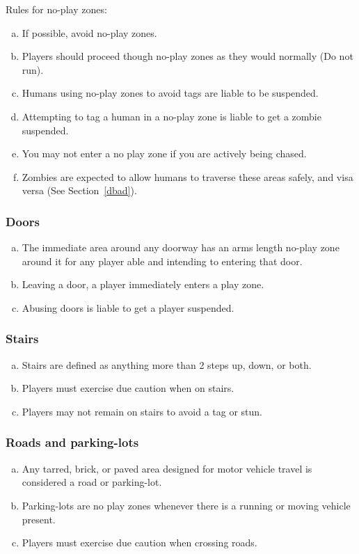 \documentclass[a4paper,12pt]{article}
\begin{document}
Rules for no-play zones:
\begin{enumerate}[(a)]
    \item If possible, avoid no-play zones.
    \item Players should proceed though no-play zones as they would normally (Do not run).
    \item Humans using no-play zones to avoid tags are liable to be suspended.     
    \item Attempting to tag a human in a no-play zone is liable to get a zombie suspended.
    \item You may not enter a no play zone if you are actively being chased.
    \item Zombies are expected to allow humans to traverse these areas safely, and visa versa (See Section~\ref{dbad}).
\end{enumerate}

\subsubsection{Doors}
\begin{enumerate}[(a)]
    \item The immediate area around any doorway has an arms length no-play zone around it for any player able and intending to entering that door. 
    \item Leaving a door, a player immediately enters a play zone.
    \item Abusing doors is liable to get a player suspended.
\end{enumerate}

\subsubsection{Stairs}
\begin{enumerate}[(a)]
    \item Stairs are defined as anything more than 2 steps up, down, or both.
    \item Players must exercise due caution when on stairs.
    \item Players may not remain on stairs to avoid a tag or stun.
\end{enumerate}

\subsubsection{Roads and parking-lots}
\begin{enumerate}[(a)]
    \item Any tarred, brick, or paved area designed for motor vehicle travel is considered a road or parking-lot.
    \item Parking-lots are no play zones whenever there is a running or moving vehicle present.
    \item Players must exercise due caution when crossing roads.
\end{enumerate}
\end{document}
